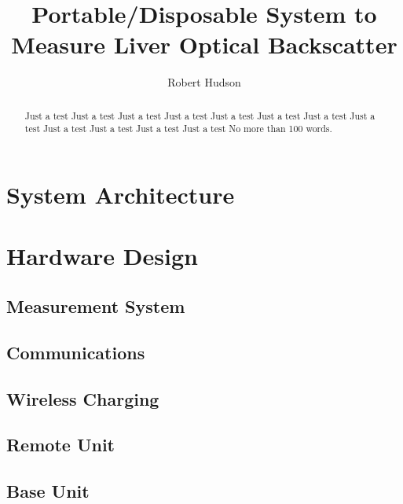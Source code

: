 \documentclass[draft]{IIBproject}
\begin{document}
\author{Robert Hudson}
\title{Portable/Disposable System to Measure Liver Optical Backscatter}
\maketitle
\thispagestyle{empty}


\begin{abstract}
Just a test Just a test Just a test Just a test Just a test Just a test 
Just a test Just a test Just a test Just a test Just a test Just a test 
No more than 100 words.
\end{abstract}

\newpage
\tableofcontents
\newpage
\pagestyle{plain}







\section{System Architecture}

\section{Hardware Design}

\subsection{Measurement System}

\subsection{Communications}

\subsection{Wireless Charging}

\subsection{Remote Unit}

\subsection{Base Unit}
\end{document}
